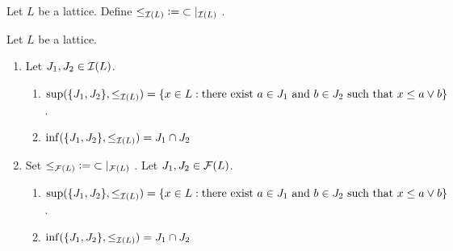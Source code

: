\documentclass{book}
\begin{document}
	\begin{defn}
		Let $L$ be a lattice. Define ${\leq_{\mathcal{I}(L)}} \vcentcolon= {\subset|_{\mathcal{I}(L)}}$ .
	\end{defn}
	
	\begin{ex}
		Let $L$ be a lattice. 
		\begin{enumerate}
			\item Let $J_1, J_2 \in \mathcal{I}(L)$.
			\begin{enumerate}
				\item $\sup(\{J_1, J_2 \}, \leq_{\mathcal{I}(L)}) = \{x \in L: \text{there exist $a \in J_1$ and $b \in J_2$ such that $x \leq a \vee b$} \}$.
				\item $\inf(\{J_1, J_2 \}, \leq_{\mathcal{I}(L)}) = J_1 \cap J_2$
			\end{enumerate}
			\item Set ${\leq_{\mathcal{F}(L)}} \vcentcolon= {\subset|_{\mathcal{F}(L)}}$ . Let $J_1, J_2 \in \mathcal{F}(L)$. 
			\begin{enumerate}
				\item $\sup(\{J_1, J_2 \}, \leq_{\mathcal{I}(L)}) = \{x \in L: \text{there exist $a \in J_1$ and $b \in J_2$ such that $x \leq a \vee b$} \}$.
				\item $\inf(\{J_1, J_2 \}, \leq_{\mathcal{I}(L)}) = J_1 \cap J_2$
			\end{enumerate}
		\end{enumerate}
	\end{ex}
	
\end{document}
